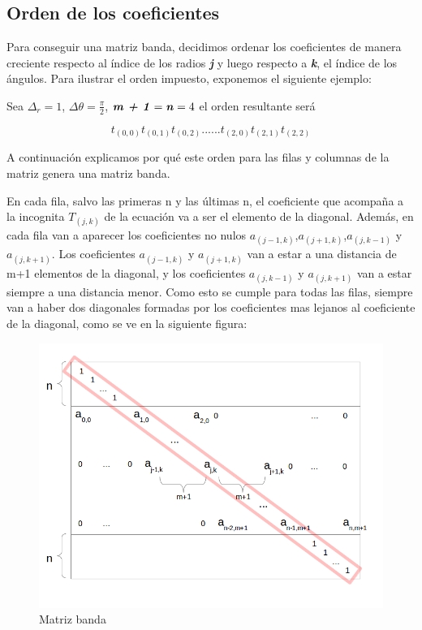 
\subsection{Orden de los coeficientes}


Para conseguir una matriz banda, decidimos ordenar los coeficientes de manera creciente respecto al índice de los radios \textbf{\textit{j}} y luego respecto a \textbf{\textit{k}}, el índice de los ángulos. Para ilustrar el orden impuesto, exponemos el siguiente ejemplo:

Sea $\Delta_{r} = 1$,  $\Delta{\theta} = \frac{\pi}{2}$, $\textbf{\textit{m + 1}} = \textbf{\textit{n}} = 4$ el orden resultante será 

$$ t_{(0,0)} t_{(0,1)} t_{(0,2)} ...... t_{(2,0)} t_{(2,1)} t_{(2,2)} $$


A continuación explicamos por qué este orden para las filas y columnas de la matriz genera una matriz banda.

En cada fila, salvo las primeras n y las últimas n, el coeficiente que acompaña a la incognita $T_{(j,k)}$ de la ecuación va a ser el elemento de la diagonal. Además, en cada fila van a aparecer los coeficientes no nulos $a_{(j-1,k)}$,$a_{(j+1,k)}$,$a_{(j,k-1)}$ y $a_{(j,k+1)}$.
Los coeficientes $a_{(j-1,k)}$ y $a_{(j+1,k)}$ van a estar a una distancia de m+1 elementos de la diagonal, y los coeficientes $a_{(j,k-1)}$ y $a_{(j,k+1)}$ van a estar siempre a una distancia menor. Como esto se cumple para todas las filas, siempre van a haber dos diagonales formadas por los coeficientes mas lejanos al coeficiente de la diagonal, como se ve en la siguiente figura:

\begin{figure}[h]
  \includegraphics[scale=0.4]{imagenes/figura1.png}
  \caption{Matriz banda}
  \label{fig:corteHorno}
\end{figure}

